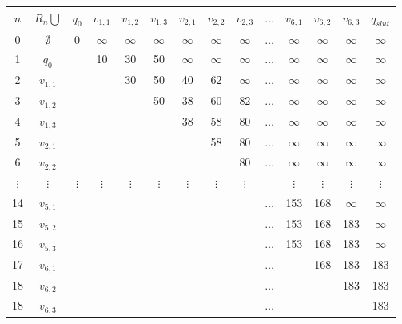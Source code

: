 
\begin{tabular}{|c|c|c|c|c|c|c|c|c|c|c|c|c|c|} 
\hline
$n$ & $R_{n} \bigcup$ & $q_{0}$ & $v_{1,1}$ & $v_{1,2}$ & $v_{1,3}$ & $v_{2,1}$ & $v_{2,2}$ & $v_{2,3}$ & $\ldots$ & $v_{6,1}$ & $v_{6,2}$ & $v_{6,3}$ & $q_{slut}$ \\
\hline
0 & $\emptyset$ & 0 & $\infty$ & $\infty$ & $\infty$ & $\infty$ & $\infty$ & $\infty$ & $\ldots$ & $\infty$ & $\infty$ & $\infty$ & $\infty$ \\ 
1 & $q_{0}$ & & 10 & 30 & 50 & $\infty$ & $\infty$ & $\infty$ & $\ldots$ & $\infty$ & $\infty$ & $\infty$ & $\infty$\\ 
2 & $v_{1,1}$ & & & 30 & 50 & 40 & 62 & $\infty$ & $\ldots$ & $\infty$ & $\infty$ & $\infty$ & $\infty$\\ 
3 & $v_{1,2}$ & & & & 50 & 38 & 60 & 82 & $\ldots$ & $\infty$ & $\infty$ & $\infty$ & $\infty$\\
4 & $v_{1,3}$ & & & & & 38 & 58 & 80 & $\ldots$ & $\infty$ & $\infty$ & $\infty$ & $\infty$\\ 
5 & $v_{2,1}$ & & & & & & 58 & 80 & $\ldots$ & $\infty$ & $\infty$ & $\infty$ & $\infty$\\ 
6 & $v_{2,2}$ & & & & & & & 80 & $\ldots$ & $\infty$ & $\infty$ & $\infty$ & $\infty$\\  
$\vdots$ & $\vdots$ & $\vdots$ & $\vdots$ & $\vdots$ & $\vdots$ & $\vdots$ & $\vdots$ & $\vdots$ &  & $\vdots$ & $\vdots$ & $\vdots$ & $\vdots$\\ 
14 & $v_{5,1}$ &  &  &  &  &  &  &  & $\ldots$ & 153 & 168 & $\infty$ & $\infty$\\ 
15 & $v_{5,2}$ &  &  &  &  &  &  &  & $\ldots$ & 153 & 168 & 183 & $\infty$\\ 
16 & $v_{5,3}$ &  &  &  &  &  &  &  & $\ldots$ & 153 & 168 & 183 & $\infty$\\ 
17 & $v_{6,1}$ &  &  &  &  &  &  &  & $\ldots$ &  & 168 & 183 & 183\\ 
18 & $v_{6,2}$ &  &  &  &  &  &  &  & $\ldots$ &  &  & 183 & 183\\ 
18 & $v_{6,3}$ &  &  &  &  &  &  &  & $\ldots$ &  &  &  & 183\\ 
\hline
\end{tabular}

